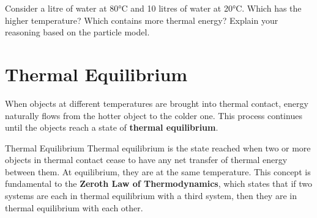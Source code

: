 \begin{stopandthink}
Consider a litre of water at 80°C and 10 litres of water at 20°C. Which has the higher temperature? Which contains more thermal energy? Explain your reasoning based on the particle model.
\end{stopandthink}


\FloatBarrier

\section{Thermal Equilibrium}
\label{sec:thermal_equilibrium}
\FloatBarrier

When objects at different temperatures are brought into thermal contact, energy naturally flows from the hotter object to the colder one. This process continues until the objects reach a state of \textbf{thermal equilibrium}.

\begin{keyconcept}{Thermal Equilibrium}
Thermal equilibrium is the state reached when two or more objects in thermal contact cease to have any net transfer of thermal energy between them. At equilibrium, they are at the same temperature. This concept is fundamental to the \textbf{Zeroth Law of Thermodynamics}, which states that if two systems are each in thermal equilibrium with a third system, then they are in thermal equilibrium with each other.
\end{keyconcept}


